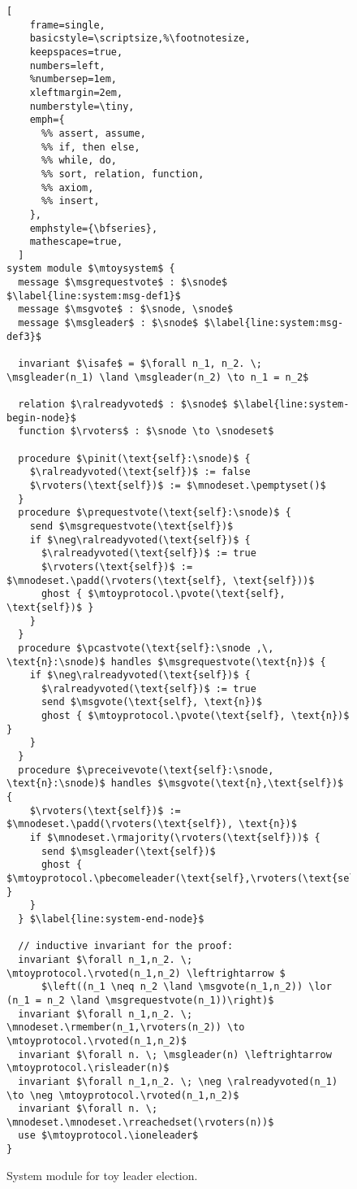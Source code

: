 \begin{figure}
\begin{lstlisting}[
    frame=single,
    basicstyle=\scriptsize,%\footnotesize,
    keepspaces=true,
    numbers=left,
    %numbersep=1em,
    xleftmargin=2em,
    numberstyle=\tiny,
    emph={
      %% assert, assume,
      %% if, then else,
      %% while, do,
      %% sort, relation, function,
      %% axiom,
      %% insert,
    },
    emphstyle={\bfseries},
    mathescape=true,
  ]
system module $\mtoysystem$ {
  message $\msgrequestvote$ : $\snode$  $\label{line:system:msg-def1}$
  message $\msgvote$ : $\snode, \snode$
  message $\msgleader$ : $\snode$ $\label{line:system:msg-def3}$

  invariant $\isafe$ = $\forall n_1, n_2. \; \msgleader(n_1) \land \msgleader(n_2) \to n_1 = n_2$

  relation $\ralreadyvoted$ : $\snode$ $\label{line:system-begin-node}$
  function $\rvoters$ : $\snode \to \snodeset$

  procedure $\pinit(\text{self}:\snode)$ {
    $\ralreadyvoted(\text{self})$ := false
    $\rvoters(\text{self})$ := $\mnodeset.\pemptyset()$
  }
  procedure $\prequestvote(\text{self}:\snode)$ {
    send $\msgrequestvote(\text{self})$
    if $\neg\ralreadyvoted(\text{self})$ {
      $\ralreadyvoted(\text{self})$ := true
      $\rvoters(\text{self})$ := $\mnodeset.\padd(\rvoters(\text{self}, \text{self}))$
      ghost { $\mtoyprotocol.\pvote(\text{self}, \text{self})$ }
    }
  }
  procedure $\pcastvote(\text{self}:\snode ,\, \text{n}:\snode)$ handles $\msgrequestvote(\text{n})$ {
    if $\neg\ralreadyvoted(\text{self})$ {
      $\ralreadyvoted(\text{self})$ := true
      send $\msgvote(\text{self}, \text{n})$
      ghost { $\mtoyprotocol.\pvote(\text{self}, \text{n})$ }
    }
  }
  procedure $\preceivevote(\text{self}:\snode, \text{n}:\snode)$ handles $\msgvote(\text{n},\text{self})$ {
    $\rvoters(\text{self})$ := $\mnodeset.\padd(\rvoters(\text{self}), \text{n})$
    if $\mnodeset.\rmajority(\rvoters(\text{self}))$ {
      send $\msgleader(\text{self})$
      ghost { $\mtoyprotocol.\pbecomeleader(\text{self},\rvoters(\text{self}))$ }
    }
  } $\label{line:system-end-node}$

  // inductive invariant for the proof:
  invariant $\forall n_1,n_2. \; \mtoyprotocol.\rvoted(n_1,n_2) \leftrightarrow $
      $\left((n_1 \neq n_2 \land \msgvote(n_1,n_2)) \lor (n_1 = n_2 \land \msgrequestvote(n_1))\right)$
  invariant $\forall n_1,n_2. \; \mnodeset.\rmember(n_1,\rvoters(n_2)) \to \mtoyprotocol.\rvoted(n_1,n_2)$
  invariant $\forall n. \; \msgleader(n) \leftrightarrow \mtoyprotocol.\risleader(n)$
  invariant $\forall n_1,n_2. \; \neg \ralreadyvoted(n_1) \to \neg \mtoyprotocol.\rvoted(n_1,n_2)$
  invariant $\forall n. \; \mnodeset.\mnodeset.\rreachedset(\rvoters(n))$
  use $\mtoyprotocol.\ioneleader$
}
\end{lstlisting}
\caption{\label{fig:toysystem}System module for toy leader election. }
\end{figure}


